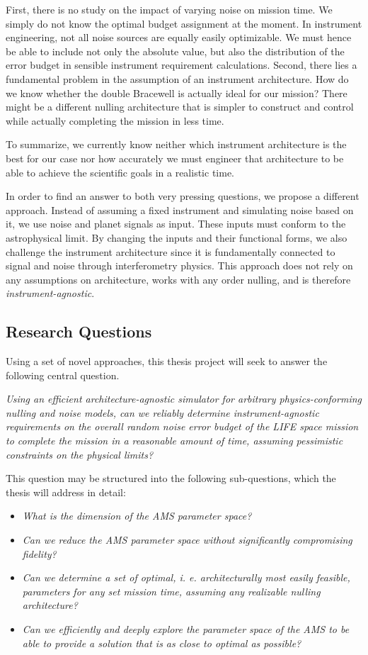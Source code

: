 \documentclass[12pt,a4paper]{article}
\numberwithin{equation}{section}
\numberwithin{figure}{section}
\numberwithin{table}{section}
\begin{document}
First, there is no study on the impact of varying noise on mission time. We simply do not know the optimal budget assignment at the moment. In instrument engineering, not all noise sources are equally easily optimizable. We must hence be able to include not only the absolute value, but also the distribution of the error budget in sensible instrument requirement calculations. Second, there lies a fundamental problem in the assumption of an instrument architecture. How do we know whether the double Bracewell is actually ideal for our mission? There might be a different nulling architecture that is simpler to construct and control while actually completing the mission in less time.

To summarize, we currently know neither which instrument architecture is the best for our case nor how accurately we must engineer that architecture to be able to achieve the scientific goals in a realistic time.

In order to find an answer to both very pressing questions, we propose a different approach. Instead of assuming a fixed instrument and simulating noise based on it, we use noise and planet signals as input. These inputs must conform to the astrophysical limit. By changing the inputs and their functional forms, we also challenge the instrument architecture since it is fundamentally connected to signal and noise through interferometry physics. This approach does not rely on any assumptions on architecture, works with any order nulling, and is therefore \textit{instrument-agnostic}.

\subsection{Research Questions} \label{sec: intro: research questions}
Using a set of novel approaches, this thesis project will seek to answer the following central question.

\textit{Using an efficient architecture-agnostic simulator for arbitrary physics-conforming nulling and noise models, can we reliably determine instrument-agnostic requirements on the overall random noise error budget of the LIFE space mission to complete the mission in a reasonable amount of time, assuming pessimistic constraints on the physical limits?}

This question may be structured into the following sub-questions, which the thesis will address in detail:
\begin{itemize}
    \item \textit{What is the dimension of the AMS parameter space?}
    \item \textit{Can we reduce the AMS parameter space without significantly compromising fidelity?}
    \item \textit{Can we determine a set of optimal, i. e. architecturally most easily feasible, parameters for any set mission time, assuming any realizable nulling architecture?}
    \item \textit{Can we efficiently and deeply explore the parameter space of the AMS to be able to provide a solution that is as close to optimal as possible?}
\end{itemize}
\end{document}
